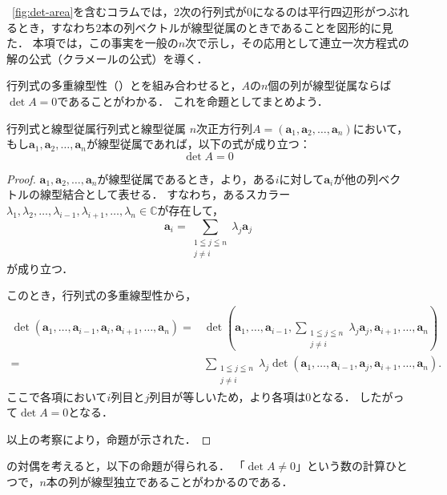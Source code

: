 \figurename~\ref{fig:det-area}を含むコラムでは，$2$次の行列式が$0$になるのは平行四辺形がつぶれるとき，すなわち$2$本の列ベクトルが線型従属のときであることを図形的に見た．
本項では，この事実を一般の$n$次で示し，その応用として連立一次方程式の解の公式（クラメールの公式）を導く．

行列式の多重線型性（）とを組み合わせると，$A$の$n$個の列が線型従属ならば$\det A =0$であることがわかる．
これを命題としてまとめよう．


\begin{prop}{行列式と線型従属}{行列式と線型従属}
  $n$次正方行列$A = (\bm{a}_1, \bm{a}_2, \dots, \bm{a}_n)$において，もし$\bm{a}_1, \bm{a}_2, \dots, \bm{a}_n$が線型従属であれば，以下の式が成り立つ：
  \[
  \det A = 0
  \]
\end{prop}

\begin{tleftbar}
\begin{proof}
  $\bm{a}_1, \bm{a}_2, \dots, \bm{a}_n$が線型従属であるとき，より，ある$i$に対して$\bm{a}_i$が他の列ベクトルの線型結合として表せる．
  すなわち，あるスカラー$\lambda_1, \lambda_2, \dots, \lambda_{i-1}, \lambda_{i+1}, \dots, \lambda_n \in \mathbb{C}$が存在して，
  \[
  \bm{a}_i = \sum_{\substack{1\leqq j\leqq n\\ j \ne i}} \lambda_j \bm{a}_j
  \]
  が成り立つ．

  このとき，行列式の多重線型性から，
  \begin{align*} 
    \det(\bm{a}_1, \dots, \bm{a}_{i-1}, \bm{a}_i, \bm{a}_{i+1}, \dots, \bm{a}_n) 
    =& \det(\bm{a}_1, \dots, \bm{a}_{i-1}, \sum_{\substack{1\leqq j\leqq n\\ j \ne i}} \lambda_j \bm{a}_j, \bm{a}_{i+1}, \dots, \bm{a}_n) \\
    =& \sum_{\substack{1\leqq j\leqq n\\ j\ne i}} \lambda_j \det(\bm{a}_1, \dots, \bm{a}_{i-1}, \bm{a}_j, \bm{a}_{i+1}, \dots, \bm{a}_n).
  \end{align*}
  ここで各項において$i$列目と$j$列目が等しいため，より各項は$0$となる．
  したがって$\det A = 0$となる．
  
  以上の考察により，命題が示された．
\end{proof}
\end{tleftbar}

の対偶を考えると，以下の命題が得られる．
「$\det A \ne 0$」という数の計算ひとつで，$n$本の列が線型独立であることがわかるのである．


